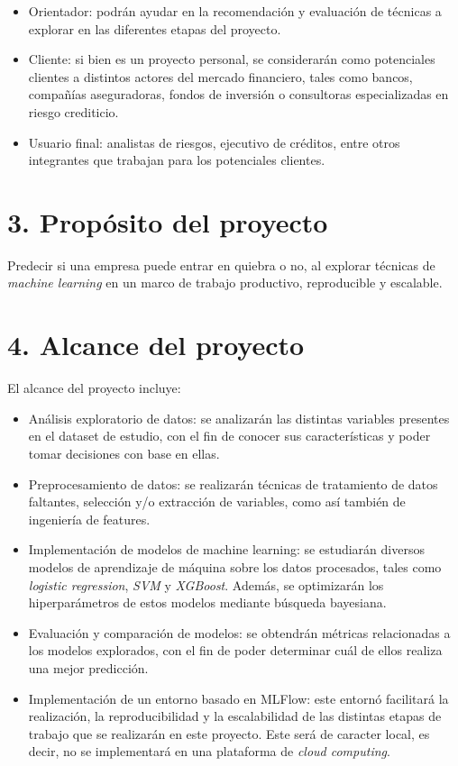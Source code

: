 \documentclass[
11pt, %
]{charter}
\begin{document}
\begin{itemize}
	\item Orientador: podrán ayudar en la recomendación y evaluación de técnicas a explorar en las diferentes etapas del proyecto.
	\item Cliente: si bien es un proyecto personal, se considerarán como potenciales clientes a distintos actores del mercado financiero, tales como bancos, compañías aseguradoras, fondos de inversión o consultoras especializadas en riesgo crediticio.
    \item Usuario final: analistas de riesgos, ejecutivo de créditos, entre otros integrantes que trabajan para los potenciales clientes.
\end{itemize}

\section{3. Propósito del proyecto}
\label{sec:proposito}

Predecir si una empresa puede entrar en quiebra o no, al explorar técnicas de \textit{machine learning} en un marco de trabajo productivo, reproducible y escalable.

\section{4. Alcance del proyecto}
\label{sec:alcance}

El alcance del proyecto incluye:
\begin{itemize}
	\item Análisis exploratorio de datos: se analizarán las distintas variables presentes en el dataset de estudio, con el fin de conocer sus características y poder tomar decisiones con base en ellas.
    \item Preprocesamiento de datos: se realizarán técnicas de tratamiento de datos faltantes, selección y/o extracción de variables, como así también de ingeniería de features.
    \item Implementación de modelos de machine learning: se estudiarán diversos modelos de aprendizaje de máquina sobre los datos procesados, tales como \textit{logistic regression}, \textit{SVM} y \textit{XGBoost}. Además, se optimizarán los hiperparámetros de estos modelos mediante búsqueda bayesiana.
    \item Evaluación y comparación de modelos: se obtendrán métricas relacionadas a los modelos explorados, con el fin de poder determinar cuál de ellos realiza una mejor predicción.
    \item Implementación de un entorno basado en MLFlow: este entornó facilitará la realización, la reproducibilidad y la escalabilidad de las distintas etapas de trabajo que se realizarán en este proyecto. Este será de caracter local, es decir, no se implementará en una plataforma de \textit{cloud computing}.
\end{itemize}
\end{document}

